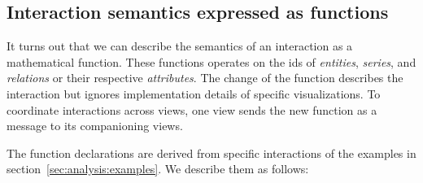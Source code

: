 \documentclass{article}
\begin{document}
\subsection{Interaction semantics expressed as functions}\label{sec:concept:semantics}

It turns out that we can describe the semantics of an interaction as a mathematical function.
These functions operates on the ids of \emph{entities}, \emph{series}, and \emph{relations} or their respective \emph{attributes}.
The change of the function describes the interaction but ignores implementation details of specific visualizations.
To coordinate interactions across views, one view sends the new function as a message to its companioning views.


The function declarations are derived from specific interactions of the examples in section~\ref{sec:analysis:examples}.
We describe them as follows:
\end{document}

